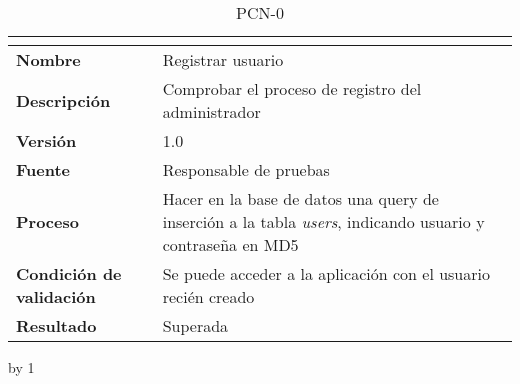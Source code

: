 \begin{table}[H]
	\caption{PCN-0\number\pcn}
	\begin{tabular}{|l|p{}|}
		\hline
		\multicolumn{2}{|c|}{\cellcolor[HTML]{BFBFBF}{\color[HTML]{000000} \textbf{PCN-0\number\pcn}}} \\ \hline
		\textbf{Nombre}                  & Registrar usuario                                                                                                 \\ \hline
		\textbf{Descripción}             & Comprobar el proceso de registro del administrador                                                                \\ \hline
		\textbf{Versión}                 & 1.0                                                                                                               \\ \hline
		\textbf{Fuente}                  & Responsable de pruebas                                                                                            \\ \hline
		\textbf{Proceso}                 & Hacer en la base de datos una query de inserción a la tabla \textit{users}, indicando usuario y contraseña en MD5 \\ \hline
		\textbf{Condición de validación} & Se puede acceder a la aplicación con el usuario recién creado                                                     \\ \hline
		\textbf{Resultado}               & Superada                                                                                                          \\ \hline
	\end{tabular}
\end{table}
\advance\pcn by 1
